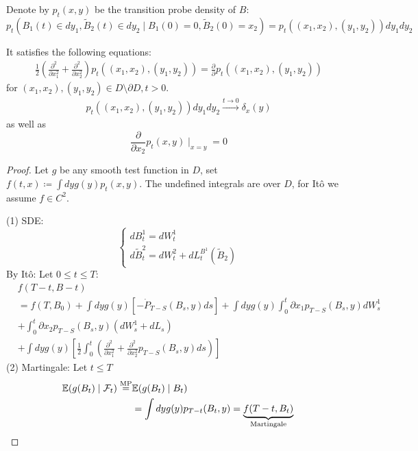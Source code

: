 \begin{proposition}\label{prop:3.11}
    Denote by $p_t(x,y)$ be the transition probe density of $B$:\[p_t(B_1(t)\in dy_1, \tilde{B}_2(t)\in dy_2\mid B_1(0)=0,\tilde{B}_2(0)=x_2)=p_t((x_1,x_2),(y_1,y_2))dy_1dy_2\] 

    It satisfies the following equations:
    \begin{align*}
        \frac{1}{2}\left(\frac{\partial^2}{\partial x_1^2}+\frac{\partial^2}{\partial x_2^2}\right)p_t((x_1,x_2),(y_1,y_2))=\frac{\partial}{\partial}p_t((x_1,x_2),(y_1,y_2))
    \end{align*}
    for $(x_1,x_2),(y_1,y_2)\in D\setminus \partial D,t>0$.
    \begin{align*}
        p_t((x_1,x_2),(y_1,y_2))dy_1dy_2\stackrel{t\to0}{\to}\delta_{x}(y)
    \end{align*}
    as well as 
    \[\frac{\partial}{\partial x_2}p_t(x,y)\mid_{x=y}=0\]

\end{proposition}

\begin{proof}
    Let $g$ be any smooth test function in $D$, set $f(t,x)\coloneqq \int dy g(y)p_t(x,y)$. The undefined integrals are over $D$, for Itô we assume $f\in C^2$.

    (1) SDE: \[\begin{cases}
        dB_t^1=dW_t^1\\
        d\tilde{B}_t^2=dW_t^2+dL_t^{B^1}(\tilde{B}_2)
    \end{cases}\]
    By Itô: Let $0\leq t\leq T$:
    \begin{align*}
        &f(T-t,B-t)\\
        &=f(T,B_0)+\int dy g(y)[-\dot{P}_{T-S}(B_s,y)ds]+\int dy g(y)\int_0^t \partial x_1 p_{T-S}(B_s,y)dW_s^1\\
        &+\int_0^t \partial x_2 p_{T-S}(B_s,y)(dW_s^1+dL_s)\\
        &+ \int dy g(y)\left[\frac{1}{2}\int_0^t\left(\frac{\partial^2}{\partial x_1^2}+\frac{\partial^2}{\partial x_2^2}p_{T-S}(B_s,y)ds\right)\right]
    \end{align*}
    (2) Martingale: Let $t\leq T$
    \begin{align*}
        \mathbb{E}(g(B_t)\mid \mathcal{F}_t)\stackrel{\text{MP}}{=}&\mathbb{E}(g(B_t)\mid B_t)\\
        &=\int dy g(y)p_{T-t}(B_t,y)=\underbrace{f(T-t,B_t)}_{\text{Martingale}}\qedhere
    \end{align*}
\end{proof}

